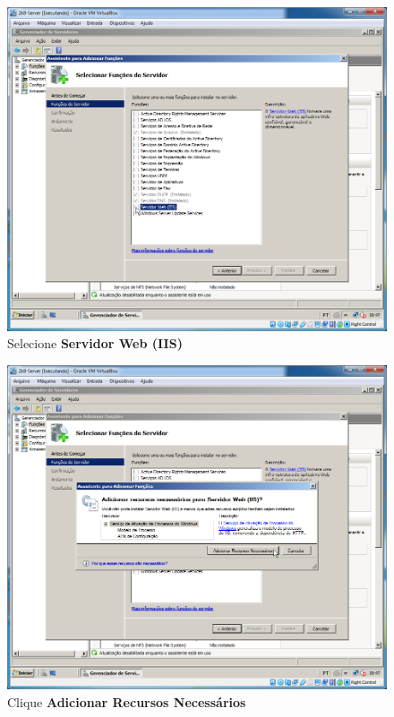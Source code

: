 \documentclass[10pt]{article}
\begin{document}
\begin{figure}[H]
    \centering
    \caption{Selecione \textbf{Servidor Web (IIS)}}
    \label{fig:IIS006}
    \includegraphics[width=\linewidth]{images/IIS/IIS006.png}
\end{figure}
\begin{figure}[H]
    \centering
    \caption{Clique \textbf{Adicionar Recursos Necessários}}
    \label{fig:IIS007}
    \includegraphics[width=\linewidth]{images/IIS/IIS007.png}
\end{figure}
\end{document}
